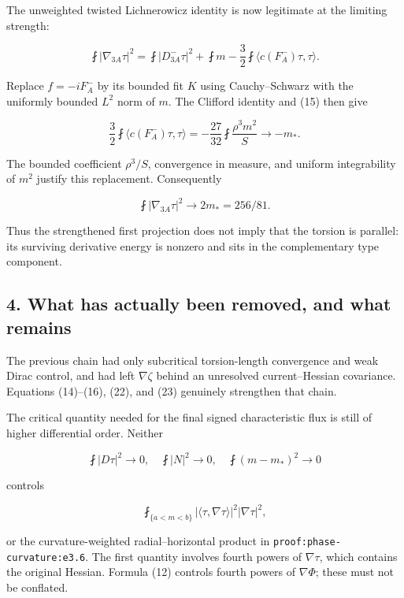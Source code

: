 \documentclass[11pt]{article}
\begin{document}
The unweighted twisted Lichnerowicz identity is now legitimate at the
limiting strength:

\[
 \fint|\nabla_{3A}\tau|^2
 =\fint|D^-_{3A}\tau|^2+\fint m
       -\frac32\fint\langle c(F_A^-)\tau,\tau\rangle.
\]

Replace \(f=-iF_A^-\) by its bounded fit \(K\) using Cauchy--Schwarz
with the uniformly bounded \(L^2\) norm of \(m\). The Clifford identity
and (15) then give

\[
 \frac32\fint\langle c(F_A^-)\tau,\tau\rangle
 =-\frac{27}{32}\fint\frac{\rho^3m^2}{S}
 \longrightarrow-m_*.
\]

The bounded coefficient \(\rho^3/S\), convergence in measure, and
uniform integrability of \(m^2\) justify this replacement. Consequently

\[
 \boxed{\fint|\nabla_{3A}\tau|^2\longrightarrow
              2m_* =256/81.}\tag{25}
\]

Thus the strengthened first projection does not imply that the torsion
is parallel: its surviving derivative energy is nonzero and sits in the
complementary type component.

\hypertarget{what-has-actually-been-removed-and-what-remains}{%
\subsection{4. What has actually been removed, and what
remains}\label{what-has-actually-been-removed-and-what-remains}}

The previous chain had only subcritical torsion-length convergence and
weak Dirac control, and had left \(\nabla\zeta\) behind an unresolved
current--Hessian covariance. Equations (14)--(16), (22), and (23)
genuinely strengthen that chain.

The critical quantity needed for the final signed characteristic flux is
still of higher differential order. Neither

\[
 \fint|D\tau|^2\to0,\quad
 \fint|N|^2\to0,\quad
 \fint(m-m_*)^2\to0
\]

controls

\[
 \fint_{\{a<m<b\}}
      |\langle\tau,\nabla\tau\rangle|^2|\nabla\tau|^2,
\tag{24}
\]

or the curvature-weighted radial--horizontal product in
\texttt{proof:phase-curvature:e3.6}. The first quantity involves fourth
powers of \textbf{\(\nabla\tau\)}, which contains the original Hessian.
Formula (12) controls fourth powers of \textbf{\(\nabla\Phi\)}; these
must not be conflated.
\end{document}

